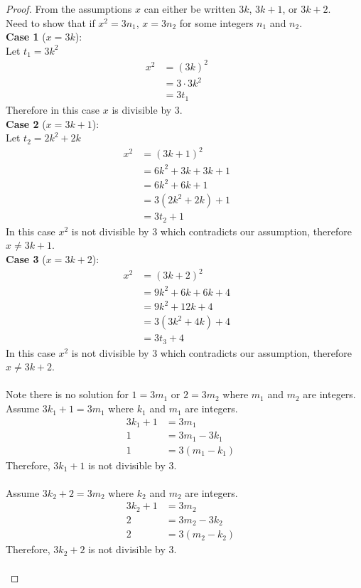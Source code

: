 \documentclass[6pt]{article}
\begin{document}
\begin{proof}
From the assumptions $x$ can either be 
written $3k$, $3k + 1$, or $3k + 2$. \\
Need to show that if $x^2 = 3n_1$, $x = 3n_2$ for 
some integers $n_1$ and $n_2$. \\
\textbf{Case 1} ($x = 3k$): \\
Let $t_1 = 3k^2$
\begin{align*}
x^2 &= {(3k)}^2 && \\
&= 3 \cdot 3k^2 && \\
&= 3 t_1
\end{align*}
Therefore in this case $x$ is divisible by $3$. \\
\textbf{Case 2} ($x = 3k + 1$): \\
Let $t_2 = 2k^2 + 2k$
\begin{align*}
x^2 &= {(3k + 1)}^2 && \\
&= 6k^2 + 3k + 3k + 1 && \\
&= 6k^2 + 6k + 1&& \\
&= 3(2k^2 + 2k) + 1 && \\
&= 3t_2 + 1
\end{align*}
In this case $x^2$ is not divisible by $3$ which contradicts
our assumption, therefore $x \not = 3k + 1$. \\
\textbf{Case 3} ($x = 3k + 2$): \\
\begin{align*}
x^2 &= {(3k + 2)}^2 && \\
&= 9k^2 + 6k + 6k + 4 && \\
&= 9k^2 + 12k + 4 && \\
&= 3(3k^2 + 4k) + 4 && \\
&= 3t_3+ 4 
\end{align*}
In this case $x^2$ is not divisible by $3$ which contradicts
our assumption, therefore $x \not = 3k + 2$. \\ \\

Note there is no solution for $1 = 3m_1$ or $2 = 3m_2$ 
where $m_1$ and $m_2$ are integers. \\
Assume $3k_1 + 1 = 3m_1$ where $k_1$ and $m_1$ are integers. \\
\begin{align*}
3k_1 + 1 &= 3m_1 & \\
1 &= 3m_1 - 3k_1 & \\
1 &= 3(m_1 - k_1) 
\end{align*}
Therefore, $3k_1 + 1$ is not divisible by 3. \\ \\
Assume $3k_2 + 2 = 3m_2$ where $k_2$ and $m_2$ are integers. \\
\begin{align*}
3k_2 + 1 &= 3m_2 & \\
2 &= 3m_2 - 3k_2 & \\
2 &= 3(m_2 - k_2)
\end{align*}
Therefore, $3k_2 + 2$ is not divisible by 3. \\ \\
\end{proof}
\end{document}
